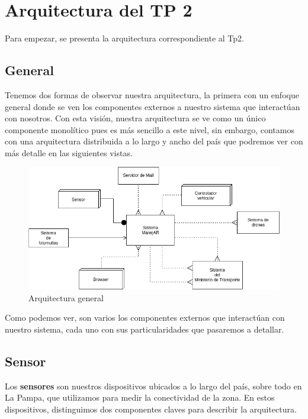 \section{Arquitectura del TP 2}

Para empezar, se presenta la arquitectura correspondiente al Tp2.

\subsection{General}

Tenemos dos formas de observar nuestra arquitectura, la primera con un enfoque general donde se ven
los componentes externos a nuestro sistema que interactúan con nosotros. Con 
esta visión, nuestra arquitectura se ve como un único componente monolítico pues es más sencillo a
este nivel, sin embargo, contamos con una arquitectura distribuida a lo largo y ancho del país 
que podremos ver con más detalle en las siguientes vistas.

\begin{figure}
\centerline{\includegraphics[width=1\textwidth]{./imagenes/arquitectura_tp2/general.png}}
\caption{Arquitectura general}
\end{figure}


Como podemos ver, son varios los componentes externos que interactúan con 
nuestro sistema, cada uno con sus particularidades que pasaremos a detallar.

\subsection{Sensor}
Los \textbf{sensores} son nuestros dispositivos ubicados a lo largo del país, sobre todo en La 
Pampa, que utilizamos para medir la conectividad de la zona.
En estos dispositivos, distinguimos dos componentes claves para describir la 
arquitectura.


